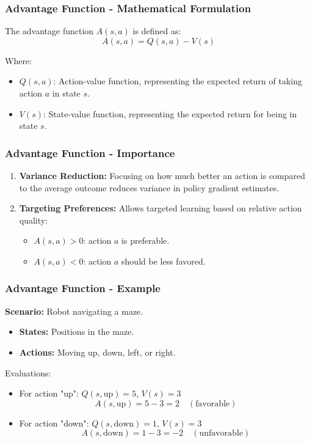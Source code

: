 \documentclass[aspectratio=169]{beamer}
\begin{document}
\begin{frame}[fragile]
    \frametitle{Advantage Function - Mathematical Formulation}
    The advantage function \( A(s, a) \) is defined as:
    \begin{equation}
        A(s, a) = Q(s, a) - V(s)
    \end{equation}
    
    Where:
    \begin{itemize}
        \item \( Q(s, a) \): Action-value function, representing the expected return of taking action \( a \) in state \( s \).
        \item \( V(s) \): State-value function, representing the expected return for being in state \( s \).
    \end{itemize}
\end{frame}

\begin{frame}[fragile]
    \frametitle{Advantage Function - Importance}
    \begin{enumerate}
        \item \textbf{Variance Reduction:} 
        Focusing on how much better an action is compared to the average outcome reduces variance in policy gradient estimates.
        
        \item \textbf{Targeting Preferences:}
        Allows targeted learning based on relative action quality:
        \begin{itemize}
            \item \( A(s, a) > 0 \): action \( a \) is preferable.
            \item \( A(s, a) < 0 \): action \( a \) should be less favored.
        \end{itemize}
    \end{enumerate}
\end{frame}

\begin{frame}[fragile]
    \frametitle{Advantage Function - Example}
    \textbf{Scenario:} Robot navigating a maze.
    
    \begin{itemize}
        \item \textbf{States:} Positions in the maze.
        \item \textbf{Actions:} Moving up, down, left, or right.
    \end{itemize}
    
    Evaluations:
    \begin{itemize}
        \item For action "up": \( Q(s, \text{up}) = 5 \), \( V(s) = 3 \) 
        \[
            A(s, \text{up}) = 5 - 3 = 2 \quad(\text{favorable})
        \]
        \item For action "down": \( Q(s, \text{down}) = 1 \), \( V(s) = 3 \) 
        \[
            A(s, \text{down}) = 1 - 3 = -2 \quad(\text{unfavorable})
        \]
    \end{itemize}
\end{frame}
\end{document}
